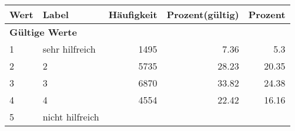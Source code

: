      \begin{longtable}{lXrrr}
     \toprule
     \textbf{Wert} & \textbf{Label} & \textbf{Häufigkeit} & \textbf{Prozent(gültig)} & \textbf{Prozent} \\
     \endhead
     \midrule
     \multicolumn{5}{l}{\textbf{Gültige Werte}}\\

     1 &
     \multicolumn{1}{X}{ sehr hilfreich   } &


       \num{1495} &
       \num[round-mode=places,round-precision=2]{7,36} &
         \num[round-mode=places,round-precision=2]{5,3} \\

     2 &
     \multicolumn{1}{X}{ 2   } &


       \num{5735} &
       \num[round-mode=places,round-precision=2]{28,23} &
         \num[round-mode=places,round-precision=2]{20,35} \\

     3 &
     \multicolumn{1}{X}{ 3   } &


       \num{6870} &
       \num[round-mode=places,round-precision=2]{33,82} &
         \num[round-mode=places,round-precision=2]{24,38} \\

     4 &
     \multicolumn{1}{X}{ 4   } &


       \num{4554} &
       \num[round-mode=places,round-precision=2]{22,42} &
         \num[round-mode=places,round-precision=2]{16,16} \\

     5 &
     \multicolumn{1}{X}{ nicht hilfreich   } &



\end{longtable}
